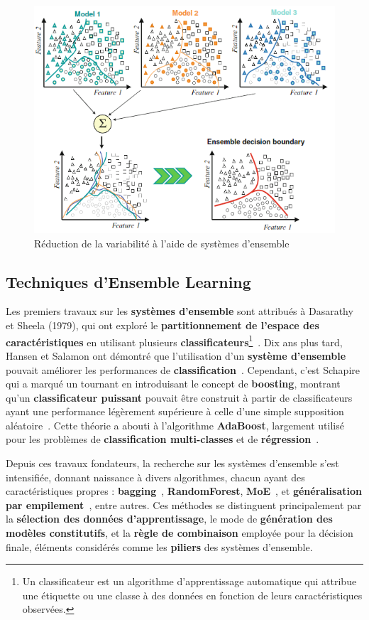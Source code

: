\begin{figure}[h!]
	\centering
	\includegraphics[width=0.8\linewidth]{images/arr-ens}
	\caption{Réduction de la variabilité à l'aide de systèmes d'ensemble\cite{polikar2012ensemble}}
	\label{fig:arr-ens}
\end{figure}
\newpage
\subsection{Techniques d'Ensemble Learning}

Les premiers travaux sur les \textbf{systèmes d'ensemble} sont attribués à Dasarathy et Sheela (1979), qui ont exploré le \textbf{partitionnement de l'espace des caractéristiques} en utilisant plusieurs \textbf{classificateurs}\footnote{Un classificateur est un algorithme d'apprentissage automatique qui attribue une étiquette ou une classe à des données en fonction de leurs caractéristiques observées.}~\cite{dasarathy1979}. Dix ans plus tard, Hansen et Salamon ont démontré que l'utilisation d'un \textbf{système d'ensemble} pouvait améliorer les performances de \textbf{classification}~\cite{hansen1990}. Cependant, c'est Schapire qui a marqué un tournant en introduisant le concept de \textbf{boosting}, montrant qu'un \textbf{classificateur puissant} pouvait être construit à partir de classificateurs ayant une performance légèrement supérieure à celle d'une simple supposition aléatoire~\cite{schapire1990}. Cette théorie a abouti à l'algorithme \textbf{AdaBoost}, largement utilisé pour les problèmes de \textbf{classification multi-classes} et de \textbf{régression}~\cite{freund1997}.

Depuis ces travaux fondateurs, la recherche sur les systèmes d'ensemble s'est intensifiée, donnant naissance à divers algorithmes, chacun ayant des caractéristiques propres : \textbf{bagging}~\cite{breiman1996}, \textbf{RandomForest}, \textbf{MoE}~\cite{jacobs1991}, et \textbf{généralisation par empilement}~\cite{wolpert1992}, entre autres. Ces méthodes se distinguent principalement par la \textbf{sélection des données d'apprentissage}, le mode de \textbf{génération des modèles constitutifs}, et la \textbf{règle de combinaison} employée pour la décision finale, éléments considérés comme les \textbf{piliers} des systèmes d'ensemble.

